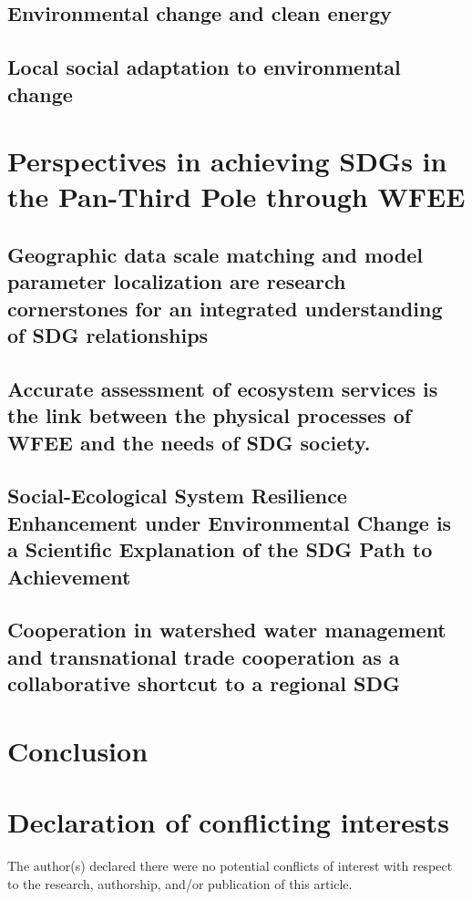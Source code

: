 \documentclass[Afour,sageh,times]{sagej}
\begin{document}
\subsection{Environmental change and clean energy}

\subsection{Local social adaptation to environmental change}



\section{Perspectives in achieving SDGs in the Pan-Third Pole through WFEE} 
\subsection{Geographic data scale matching and model parameter localization are research cornerstones for an integrated understanding of SDG relationships}

\subsection{Accurate assessment of ecosystem services is the link between the physical processes of WFEE and the needs of SDG society.}

\subsection{Social-Ecological System Resilience Enhancement under Environmental Change is a Scientific Explanation of the SDG Path to Achievement}

\subsection{Cooperation in watershed water management and transnational trade cooperation as a collaborative shortcut to a regional SDG}


\section{Conclusion}

\section{Declaration of conflicting interests}
The author(s) declared there were no potential conflicts of 
interest with respect to the research, authorship, and/or publication 
of this article.
\end{document}
